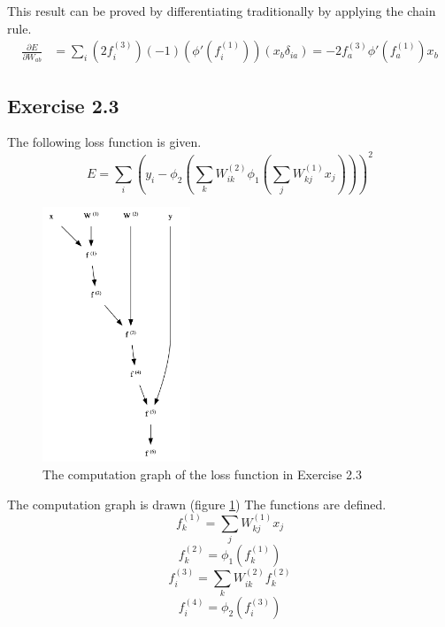 \documentclass[fleqn]{article}
\begin{document}
This result can be proved by differentiating traditionally by applying the chain rule.
\begin{equation}
    \begin{split}
        \frac{\partial E}{\partial W_{ab}} & = \sum_i \left ( 2 f^{(3)}_i \right ) \left ( -1 \right ) \left ( \phi'\left(f^{(1)}_i \right) \right ) \left ( x_b \delta_{ia}\right ) =
        -2 f^{(3)}_a \phi'\left(f^{(1)}_a\right) x_b
    \end{split}
\end{equation}

\subsection*{Exercise 2.3}
The following loss function is given.
\begin{equation}
    E=\sum_i \left ( y_i - \phi_2 \left ( \sum_k W^{(2)}_{ik} \phi_1 \left ( \sum_j W^{(1)}_{kj} x_j \right ) \right ) \right )^2
\end{equation}
\begin{figure}
    \centering
    \includegraphics[height=3in]{cg23.png}
    \caption{The computation graph of the loss function in Exercise 2.3}
    \label{fig:cg23}
\end{figure}
The computation graph is drawn (figure \ref{fig:cg23}) The functions are defined.
\begin{equation}
    f^{(1)}_k = \sum_j W^{(1)}_{kj} x_j
\end{equation}
\begin{equation}
    f^{(2)}_k = \phi_1 (f^{(1)}_k)
\end{equation}
\begin{equation}
    f^{(3)}_i = \sum_k W^{(2)}_{ik} f^{(2)}_k
\end{equation}
\begin{equation}
    f^{(4)}_i = \phi_2 (f^{(3)}_i)
\end{equation}
\end{document}
